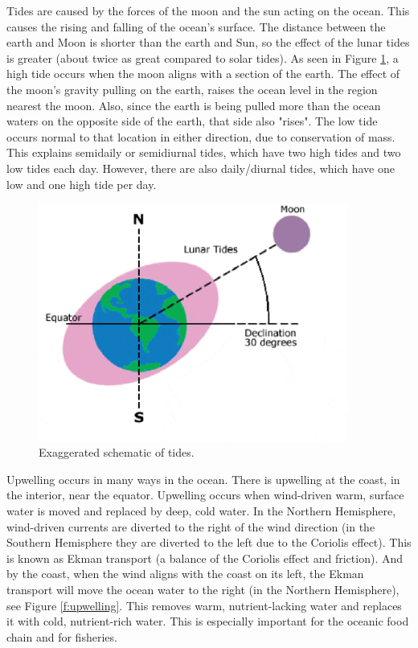 Tides are caused by the forces of the moon and the sun acting on the ocean.  This causes the rising and falling of the ocean's surface.  The distance between the earth and Moon is shorter than the earth and Sun, so the effect of the lunar tides is greater (about twice as great compared to solar tides).  As seen in Figure \protect \ref{f:Tides}, a high tide occurs when the moon aligns with a section of the earth.  The effect of the moon's gravity pulling on the earth, raises the ocean level in the region nearest the moon.  Also, since the earth is being pulled more than the ocean waters on the opposite side of the earth, that side also "rises".  The low tide occurs normal to that location in either direction, due to conservation of mass.  This explains semidaily or semidiurnal tides, which have two high tides and two low tides each day.  However, there are also daily/diurnal tides, which have one low and one high tide per day.

\begin{center}
\begin{figure}[h!]
\centering
  \includegraphics[width=4in]{Images/tidal}
  \caption[Exaggerated schematic of tides]{Exaggerated schematic of tides.  \cite{tides}}\label{f:Tides}
\end{figure}
\end{center}

Upwelling occurs in many ways in the ocean.   There is upwelling at the coast, in the interior, near the equator.  Upwelling occurs when wind-driven warm, surface water is moved and replaced by deep, cold water.  In the Northern Hemisphere, wind-driven currents are diverted to the right of the wind direction (in the Southern Hemisphere they are diverted to the left due to the Coriolis effect).  This is known as Ekman transport (a balance of the Coriolis effect and friction).  And by the coast, when the wind aligns with the coast on its left, the Ekman transport will move the ocean water to the right (in the Northern Hemisphere), see Figure \ref{f:upwelling}.  This removes warm, nutrient-lacking water and replaces it with cold, nutrient-rich water.  This is especially important for the oceanic food chain and for fisheries.  


